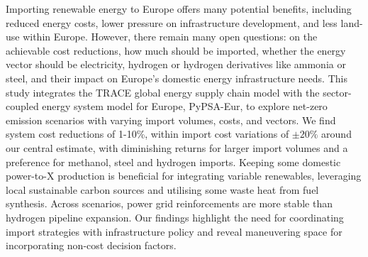 
Importing renewable energy to Europe offers many potential benefits, including
reduced energy costs, lower pressure on infrastructure development, and
less land-use within Europe.
However, there remain many open questions: on the achievable cost reductions,
how much should be imported, whether the energy vector should be electricity,
hydrogen or hydrogen derivatives like ammonia or steel, and their impact on
Europe's domestic energy infrastructure needs.
This study integrates the TRACE global energy supply chain model with the
sector-coupled energy system model for Europe, PyPSA-Eur, to explore net-zero
emission scenarios with varying import volumes, costs, and vectors.
We find system cost reductions of 1-10\%, within import cost variations of
$\pm20\%$ around our central estimate, with diminishing returns for larger
import volumes and a preference for methanol, steel and hydrogen imports.
Keeping some domestic power-to-X production is beneficial for integrating
variable renewables, leveraging local sustainable carbon sources and utilising
some waste heat from fuel synthesis. Across scenarios, power grid reinforcements
are more stable than hydrogen pipeline expansion.
Our findings highlight the need for coordinating import strategies with
infrastructure policy and reveal maneuvering space for incorporating non-cost
decision factors.
